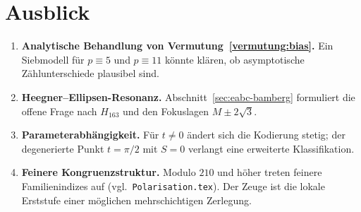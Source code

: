 \documentclass[11pt,a4paper]{article}
\theoremstyle{definition}
\theoremstyle{plain}
\begin{document}
	\section{Ausblick}
	
	\begin{enumerate}[label=\arabic*.]
		\item \textbf{Analytische Behandlung von Vermutung~\ref{vermutung:bias}.} Ein Siebmodell für $p\equiv 5$ und $p\equiv 11$ könnte klären, ob asymptotische Zählunterschiede plausibel sind.
		\item \textbf{Heegner--Ellipsen-Resonanz.} Abschnitt~\ref{sec:eabc-bamberg} formuliert die offene Frage nach $H_{163}$ und den Fokuslagen $M\pm2\sqrt{3}$.
		\item \textbf{Parameterabhängigkeit.} Für $t\neq 0$ ändert sich die Kodierung stetig; der degenerierte Punkt $t=\pi/2$ mit $S=0$ verlangt eine erweiterte Klassifikation.
		\item \textbf{Feinere Kongruenzstruktur.} Modulo $210$ und höher treten feinere Familienindizes auf (vgl.\ \texttt{Polarisation.tex}). Der Zeuge ist die lokale Erststufe einer möglichen mehrschichtigen Zerlegung.
	\end{enumerate}
	
\end{document}
